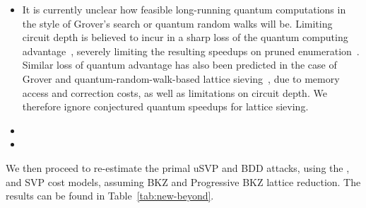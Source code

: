 \begin{itemize}
	\item It is currently unclear how feasible long-running quantum computations in the style of Grover's search or quantum random walks will be. Limiting circuit depth is believed to incur in a sharp loss of the quantum computing advantage~\cite{EC:JNRV20}, severely limiting the resulting speedups\cite{NISTPQC-R1:NTRU-HRSS-KEM17,AC:AonNguShe18} on pruned enumeration~\cite{C:BBTV24}. Similar loss of quantum advantage has also been predicted in the case of Grover and quantum-random-walk-based lattice sieving~\cite{AC:AGPS20,cryptoeprint:2024/1692}, due to memory access and correction costs, as well as limitations on circuit depth. We therefore ignore conjectured quantum speedups for lattice sieving.
	\item {}
	\item {}
\end{itemize}

We then proceed to re-estimate the primal uSVP and BDD attacks, using the \clsfsieve, \cmemsieve and \cparaenum SVP cost models, assuming BKZ and Progressive BKZ lattice reduction. The results can be found in Table~\ref{tab:new-beyond}.

